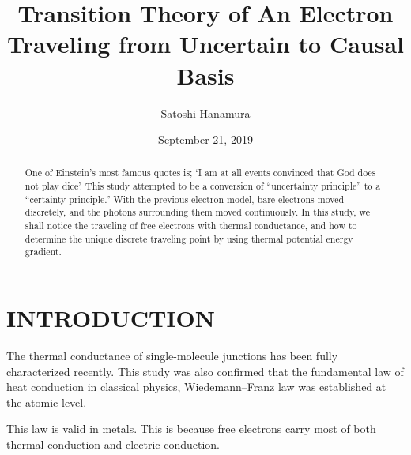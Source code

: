 \documentclass[reprint,amsmath,amssymb,aps,]{revtex4-1}
\numberwithin{equation}{section}%
\begin{document}



    \title{Transition Theory of An Electron \\ Traveling from Uncertain to Causal Basis}
    \author{Satoshi Hanamura}
    \date{September 21, 2019}
        \begin{abstract}
        One of Einstein's most famous quotes is; `I am at all events convinced that God does not play dice'. This study attempted to be a conversion of ``uncertainty principle'' to a ``certainty principle.'' With the previous electron model, bare electrons moved discretely, and the photons surrounding them moved continuously. In this study, we shall notice the traveling of free electrons with thermal conductance, and how to determine the unique discrete traveling point by using thermal potential energy gradient.
        \end{abstract}
    \maketitle

\section{\label{sec:INTRODUCTION}INTRODUCTION}


    The thermal conductance of single-molecule junctions has been fully characterized \cite{Pauly} recently. This study was also confirmed that the fundamental law of heat conduction in classical physics, Wiedemann–Franz law was established at the atomic level.

    This law is valid in metals. This is because free electrons carry most of both thermal conduction and electric conduction.
    
\end{document}
